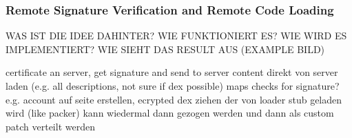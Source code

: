 \subsubsection{Remote Signature Verification and Remote Code Loading} \label{subsubsection:counter-tampering-signature-remote}

WAS IST DIE IDEE DAHINTER? WIE FUNKTIONIERT ES? WIE WIRD ES IMPLEMENTIERT? WIE SIEHT DAS RESULT AUS (EXAMPLE BILD)\newline

certificate an server, get signature and send to server\newline
content direkt von server laden (e.g. all descriptions, not sure if dex possible)\newline
maps checks for signature?\newline
e.g. account auf seite erstellen, ecrypted dex ziehen der von loader stub geladen wird (like packer)
kann wiedermal dann gezogen werden und dann als custom patch verteilt werden\newline
